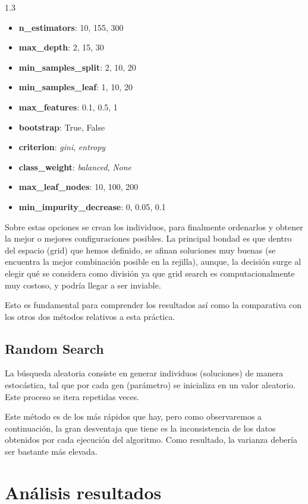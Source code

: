 \documentclass{article}
\begin{document}
\begin{spacing}{1.3}
        
\begin{itemize}
    \item \textbf{n\_estimators}: 10, 155, 300
    \item \textbf{max\_depth}: 2, 15, 30
    \item \textbf{min\_samples\_split}: 2, 10, 20
    \item \textbf{min\_samples\_leaf}: 1, 10, 20
    \item \textbf{max\_features}: 0.1, 0.5, 1
    \item \textbf{bootstrap}: True, False
    \item \textbf{criterion}: \textit{gini}, \textit{entropy}
    \item \textbf{class\_weight}: \textit{balanced}, \textit{None}
    \item \textbf{max\_leaf\_nodes}: 10, 100, 200
    \item \textbf{min\_impurity\_decrease}: 0, 0.05, 0.1
\end{itemize}

Sobre estas opciones se crean los individuos, para finalmente ordenarlos y obtener
la mejor o mejores configuraciones posibles. La principal bondad es que dentro del espacio
(grid) que hemos definido, se afinan soluciones muy buenas (se encuentra la mejor combinación posible en la rejilla),
aunque, la decisión surge al elegir qué se considera como división ya que grid search
es computacionalmente muy costoso, y podría llegar a ser inviable.

Esto es fundamental para comprender los resultados así como la comparativa con los otros dos métodos 
relativos a esta práctica.\newline


\subsection{Random Search}
La búsqueda aleatoria consiste en generar individuos (soluciones) de manera estocástica,
tal que por cada gen (parámetro) se inicializa en un valor aleatorio. Este proceso
se itera repetidas veces.\newline

Este método es de los más rápidos que hay, pero como observaremos a continuación, la gran 
desventaja que tiene es la inconsistencia de los datos obtenidos por cada ejecución del 
algoritmo. Como resultado, la varianza debería ser bastante más elevada.



\section{Análisis resultados}


\end{spacing}
\end{document}
